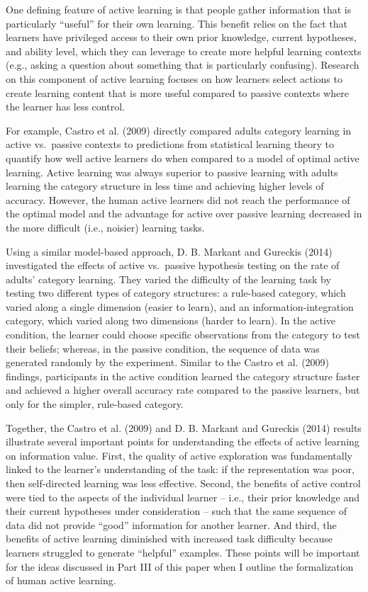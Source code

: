 \documentclass[english,floatsintext,man]{apa6}
\theoremstyle{definition}
\theoremstyle{definition}
\theoremstyle{definition}
\theoremstyle{remark}
\begin{document}
One defining feature of active learning is that people gather
information that is particularly \enquote{useful} for their own
learning. This benefit relies on the fact that learners have privileged
access to their own prior knowledge, current hypotheses, and ability
level, which they can leverage to create more helpful learning contexts
(e.g., asking a question about something that is particularly
confusing). Research on this component of active learning focuses on how
learners select actions to create learning content that is more useful
compared to passive contexts where the learner has less control.

For example, Castro et al. (2009) directly compared adults category
learning in active vs.~passive contexts to predictions from statistical
learning theory to quantify how well active learners do when compared to
a model of optimal active learning. Active learning was always superior
to passive learning with adults learning the category structure in less
time and achieving higher levels of accuracy. However, the human active
learners did not reach the performance of the optimal model and the
advantage for active over passive learning decreased in the more
difficult (i.e., noisier) learning tasks.

Using a similar model-based approach, D. B. Markant and Gureckis (2014)
investigated the effects of active vs.~passive hypothesis testing on the
rate of adults' category learning. They varied the difficulty of the
learning task by testing two different types of category structures: a
rule-based category, which varied along a single dimension (easier to
learn), and an information-integration category, which varied along two
dimensions (harder to learn). In the active condition, the learner could
choose specific observations from the category to test their beliefs;
whereas, in the passive condition, the sequence of data was generated
randomly by the experiment. Similar to the Castro et al. (2009)
findings, participants in the active condition learned the category
structure faster and achieved a higher overall accuracy rate compared to
the passive learners, but only for the simpler, rule-based category.

Together, the Castro et al. (2009) and D. B. Markant and Gureckis (2014)
results illustrate several important points for understanding the
effects of active learning on information value. First, the quality of
active exploration was fundamentally linked to the learner's
understanding of the task: if the representation was poor, then
self-directed learning was less effective. Second, the benefits of
active control were tied to the aspects of the individual learner --
i.e., their prior knowledge and their current hypotheses under
consideration -- such that the same sequence of data did not provide
\enquote{good} information for another learner. And third, the benefits
of active learning diminished with increased task difficulty because
learners struggled to generate \enquote{helpful} examples. These points
will be important for the ideas discussed in Part III of this paper when
I outline the formalization of human active learning.
\end{document}
